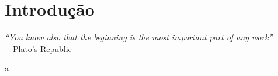\chapter*{Introdução}
%
\hfill%
\begin{minipage}{10cm}
\begin{flushright}
\rightskip=0.5cm
\textit{``You know also that the beginning is the most important part of any work''}
\\[0.1cm]
\rightskip=0.5cm
---Plato's Republic
\end{flushright}
\end{minipage}

a